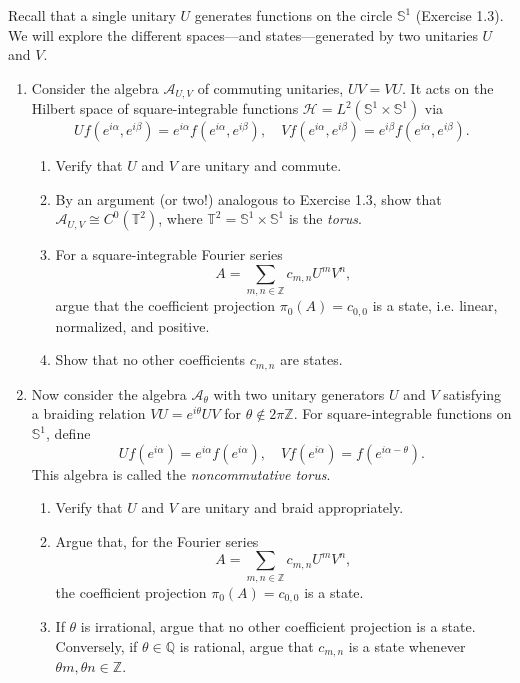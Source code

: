 \noindent Recall that a single unitary $U$ generates functions on the circle $\mathbb{S}^1$
(Exercise 1.3). We will explore the different spaces---and
states---generated by two unitaries $U$ and $V$.
\begin{enumerate}[label=(\alph*), itemsep=-1pt]
\item Consider the algebra $\mathcal{A}_{U,V}$ of commuting unitaries,
  $UV = VU$. It acts on the Hilbert space of square-integrable functions $\mathcal{H} =
  L^2(\mathbb{S}^1\times \mathbb{S}^1)$ via
  \[
    U f(e^{i\alpha}, e^{i\beta}) = e^{i\alpha} f(e^{i\alpha}, e^{i\beta}), \quad V f(e^{i\alpha}, e^{i\beta}) = e^{i\beta} f(e^{i\alpha}, e^{i\beta}).
  \]
  \begin{enumerate}[label=\roman*., itemsep=-1pt]
  \item Verify that $U$ and $V$ are unitary and commute.
  \item By an argument (or two!) analogous to Exercise 1.3, show that
    $\mathcal{A}_{U,V} \cong C^0(\mathbb{T}^2)$, where $\mathbb{T}^2 =
    \mathbb{S}^1\times \mathbb{S}^1$ is the
    \emph{torus}.
  \item For a square-integrable Fourier series
    \[
      A = \sum_{m,n\in\mathbb{Z}}  c_{m,n} U^m V^n,
    \]
    argue that the coefficient projection $\pi_{0}(A) = c_{0,0}$ is a state, i.e. linear,
    normalized, and positive.
  \item Show that no other coefficients $c_{m,n}$ are states.
  \end{enumerate}
\item Now consider the algebra $\mathcal{A}_\theta$ with two unitary
  generators $U$ and $V$ satisfying a braiding relation $VU = e^{i\theta} UV$ for $\theta \not\in
  2\pi\mathbb{Z}$. For square-integrable functions on $\mathbb{S}^1$, define
  \[
    Uf (e^{i\alpha}) = e^{i\alpha} f(e^{i\alpha}), \quad V
    f(e^{i\alpha}) = f(e^{i\alpha-\theta}).
  \]
  This algebra is called the \emph{noncommutative torus}.
  \begin{enumerate}[label=\roman*., itemsep=-1pt]
  \item Verify that $U$ and $V$ are unitary and braid appropriately.
  \item Argue that, for the Fourier series
    \[
      A = \sum_{m,n\in\mathbb{Z}}  c_{m,n} U^m V^n,
    \]
    the coefficient projection $\pi_{0}(A) = c_{0,0}$ is a state.
  \item If $\theta$ is irrational, argue that no other coefficient
    projection is a state.
    Conversely, if $\theta \in \mathbb{Q}$ is
    rational, argue that $c_{m,n}$ is a state whenever $\theta m,
    \theta n \in \mathbb{Z}$.
  \end{enumerate}
  \end{enumerate}
    
